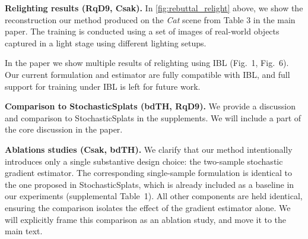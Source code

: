 \documentclass[10pt,twocolumn,letterpaper]{article}
\newcommand{\Rone}{\textcolor{rred}{\textbf{RqD9}}\xspace}
\newcommand{\Rtwo}{\textcolor{rblue}{\textbf{Csak}}\xspace}
\newcommand{\Rthree}{\textcolor{rgreen}{\textbf{bdTH}}\xspace}
\newcommand{\myparagraph}[1]{\noindent\textbf{#1}}
\begin{document}


\myparagraph{Relighting results (\Rone, \Rtwo).}
%
%
%
In \cref{fig:rebuttal_relight} above, we show the reconstruction our method produced on the \textit{Cat} scene from Table 3 in the main paper. The training is conducted using a set of images of real-world objects captured in a light stage using different lighting setups.

In the paper we show multiple results of relighting using IBL (Fig.~1, Fig.~6). Our current formulation and estimator are fully compatible with IBL, and full support for training under IBL is left for future work.

\myparagraph{Comparison to StochasticSplats (\Rthree, \Rone).}
%
%
We provide a discussion and comparison to StochasticSplats in the supplements. We will include a part of the core discussion in the paper.

\myparagraph{Ablations studies (\Rtwo, \Rthree).}
%
We clarify that our method intentionally introduces only a single substantive design choice: the two-sample stochastic gradient estimator. The corresponding single-sample formulation is identical to the one proposed in StochasticSplats, which is already included as a baseline in our experiments (supplemental Table~1). All other components are held identical, ensuring the comparison isolates the effect of the gradient estimator alone. We will explicitly frame this comparison as an ablation study, and move it to the main text.
\end{document}
